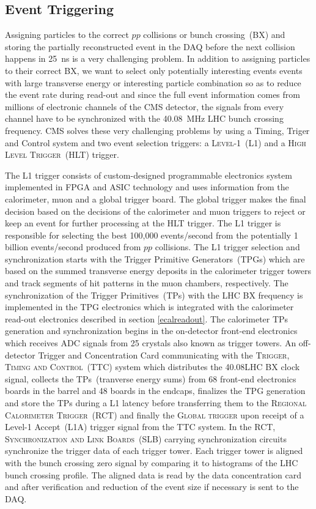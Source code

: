 \subsection{Event Triggering}
Assigning particles to the correct $pp$ collisions or bunch crossing~(BX) and storing the partially reconstructed event in the DAQ before the next collision happens in 25~ns is a very challenging problem. In addition to assigning particles to their correct BX, we want to select only potentially interesting events \ie events with large transverse energy or interesting particle combination so as to reduce the event rate during read-out and since the full event information comes from  millions of electronic channels of the CMS detector, the signals from every channel have to be synchronized with the 40.08~MHz LHC bunch crossing frequency. CMS solves these very challenging problems by using a Timing, Triger and Control system and two event selection triggers: a \textsc{Level}-1~(L1) and a \textsc{High Level Trigger}~(HLT) trigger. 
\par 
The L1 trigger consists of custom-designed programmable electronics system implemented in FPGA and ASIC technology and uses information from the calorimeter, muon and a global trigger board. The global trigger makes the final decision based on the decisions of the calorimeter and muon triggers to reject or keep an event for further processing at the HLT trigger. The L1 trigger is responsible for selecting the best 100,000 events/second from the potentially 1 billion events/second produced from $pp$ collisions. The L1 trigger selection and synchronization starts with the Trigger Primitive Generators~(TPGs) which are based on the summed transverse energy deposits in the calorimeter trigger towers and track segments of hit patterns in the muon chambers, respectively. The synchronization of the Trigger Primitives~(TPs) with the LHC BX frequency is implemented in the TPG electronics which is integrated with the calorimeter read-out electronics described in section \ref{ecalreadout}. The calorimeter TPs generation and synchronization begins in the on-detector front-end electronics which receives ADC signals from 25 crystals also known as trigger towers. An off-detector Trigger and Concentration Card communicating with the \textsc{Trigger, Timing and Control}~(TTC) system which distributes the 40.08\MHz LHC BX clock signal, collects the TPs~(tranverse energy sums) from 68 front-end electronics boards in the barrel and 48 boards in the endcaps, finalizes the TPG generation and store the TPs during a L1 latency before transferring them to the \textsc{Regional Calorimeter Trigger}~(RCT) and finally the \textsc{Global trigger} upon receipt of a Level-1 Accept~(L1A) trigger signal from the TTC system. In the RCT, \textsc{Synchronization and Link Boards}~(SLB) carrying synchronization circuits synchronize the trigger data of each trigger tower. Each trigger tower is aligned with the bunch crossing zero signal by comparing it to histograms of the LHC bunch crossing profile. The aligned data is read by the data concentration card and after verification and reduction of the event size if necessary is sent to the DAQ. 
